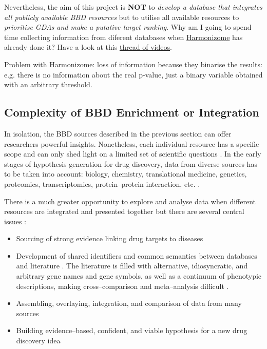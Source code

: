 Nevertheless, the aim of this project is \textbf{NOT} to \emph{develop a database that integrates all publicly available BBD resources} but to utilise all available resources to \emph{prioritise GDAs and make a putative target ranking}. Why am I going to spend time collecting information from diferent databases when \href{http://amp.pharm.mssm.edu/Harmonizome/about}{Harmonizome} \cite{harmonizome2016} has already done it? Have a look at this \href{https://www.youtube.com/watch?v=yGkIQjeWh9U&list=PL0Bwuj8819U8KXTPDSRe59ZPOYizZIpCS}{thread of videos}.

Problem with Harmonizome: loss of information because they binarise the results: e.g. there is no information about the real p-value, just a binary variable obtained with an arbitrary threshold.

\subsection{Complexity of BBD Enrichment or Integration}
In isolation, the BBD sources described in the previous section can offer researchers powerful insights. Nonetheless, each individual resource has a specific scope and can only shed light on a limited set of scientific questions \cite{brown2018}.  In the early stages of hypothesis generation for drug discovery, data from diverse sources has to be taken into account: biology, chemistry, translational medicine, genetics, proteomics, transcriptomics, protein--protein interaction, etc. \cite{brown2018}.

There is a much greater opportunity to explore and analyse data when different resources are integrated and presented together but there are several central issues \cite{brown2018}:
\begin{itemize}
    \item Sourcing of strong evidence linking drug targets to diseases
    \item Development of shared identifiers and common semantics between databases and literature \cite{brown2018}. The literature is filled with alternative, idiosyncratic, and arbitrary gene names and gene symbols, as well as a continuum of phenotypic descriptions, making cross--comparison and meta--analysis difficult \cite{gad2004}.
    \item Assembling, overlaying, integration, and comparison of data from many sources
    \item Building evidence--based, confident, and viable hypothesis for a new drug discovery idea
\end{itemize}

